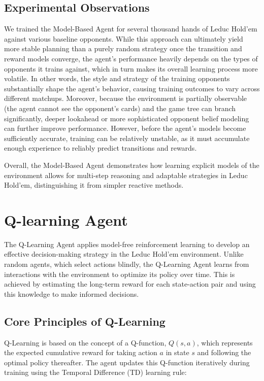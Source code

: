 \documentclass{article}
\begin{document}
\subsection{Experimental Observations}
We trained the Model-Based Agent for several thousand hands of Leduc Hold’em against various baseline opponents. While this approach can ultimately yield more stable planning than a purely random strategy once the transition and reward models converge, the agent’s performance heavily depends on the types of opponents it trains against, which in turn makes its overall learning process more volatile. In other words, the style and strategy of the training opponents substantially shape the agent’s behavior, causing training outcomes to vary across different matchups. Moreover, because the environment is partially observable (the agent cannot see the opponent’s cards) and the game tree can branch significantly, deeper lookahead or more sophisticated opponent belief modeling can further improve performance. However, before the agent’s models become sufficiently accurate, training can be relatively unstable, as it must accumulate enough experience to reliably predict transitions and rewards. 

Overall, the Model-Based Agent demonstrates how learning explicit models of the environment allows for multi-step reasoning and adaptable strategies in Leduc Hold’em, distinguishing it from simpler reactive methods.

\section{Q-learning Agent}
The Q-Learning Agent applies model-free reinforcement learning to develop an effective decision-making strategy in the Leduc Hold’em environment. Unlike random agents, which select actions blindly, the Q-Learning Agent learns from interactions with the environment to optimize its policy over time. This is achieved by estimating the long-term reward for each state-action pair and using this knowledge to make informed decisions.

\subsection{Core Principles of Q-Learning}

Q-Learning is based on the concept of a Q-function, $Q(s, a)$, which represents the expected cumulative reward for taking action $a$ in state $s$ and following the optimal policy thereafter. The agent updates this Q-function iteratively during training using the Temporal Difference (TD) learning rule:
\end{document}

